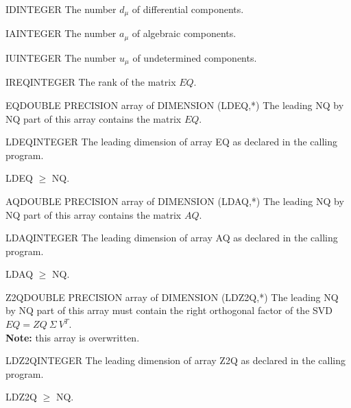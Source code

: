 \begin{entry}{ID}{INTEGER}
  The number $d_{\mu}$ of differential components.
\end{entry}

\begin{entry}{IA}{INTEGER}
  The number $a_{\mu}$ of algebraic components. 
\end{entry}

\begin{entry}{IU}{INTEGER}
  The number $u_{\mu}$ of undetermined components. 
\end{entry}

\begin{entry}{IREQ}{INTEGER}
  The rank of the matrix $EQ$.
\end{entry}

\begin{entry}{EQ}{DOUBLE PRECISION array of DIMENSION (LDEQ,*)}
  The leading NQ by NQ part of this array contains the
  matrix $EQ$.
\end{entry}

\begin{entry}{LDEQ}{INTEGER}
  The leading dimension of array EQ as declared in the calling program.

  LDEQ $\ge $ NQ.
\end{entry}

\begin{entry}{AQ}{DOUBLE PRECISION array of DIMENSION (LDAQ,*)}
  The leading NQ by NQ part of this array contains the
  matrix $AQ$.
\end{entry}

\begin{entry}{LDAQ}{INTEGER}
  The leading dimension of array AQ as declared in the calling program.

  LDAQ $\ge$ NQ.
\end{entry}

\begin{entry}{Z2Q}{DOUBLE PRECISION array of DIMENSION (LDZ2Q,*)}
  The leading NQ by NQ part of this array must contain the
  right orthogonal factor of the SVD $EQ = ZQ\ \Sigma\ V^T$.\\
  {\bf Note:} this array is overwritten.
\end{entry}

\begin{entry}{LDZ2Q}{INTEGER}
  The leading dimension of array Z2Q as declared in the calling program.

  LDZ2Q $\ge$ NQ.
\end{entry}

